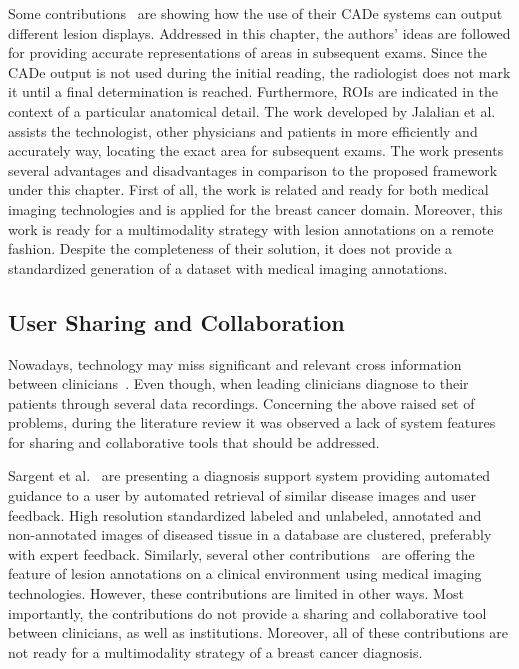 Some contributions~\cite{10.1001/jamainternmed.2015.5231, jiang2018interpretation, 10.1145/3373017.3373051} are showing how the use of their \ac{CADe} systems can output different lesion displays.
Addressed in this chapter, the authors' ideas are followed for providing accurate representations of areas in subsequent exams.
Since the \ac{CADe} output is not used during the initial reading, the radiologist does not mark it until a final determination is reached.
Furthermore, \acp{ROI} are indicated in the context of a particular anatomical detail.
The work developed by Jalalian et al.~\cite{JALALIAN2013420} assists the technologist, other physicians and patients in more efficiently and accurately way, locating the exact area for subsequent exams.
The work presents several advantages and disadvantages in comparison to the proposed framework under this chapter.
First of all, the work is related and ready for both medical imaging technologies and is applied for the breast cancer domain.
Moreover, this work is ready for a multimodality strategy with lesion annotations on a remote fashion.
Despite the completeness of their solution, it does not provide a standardized generation of a dataset with medical imaging annotations.

\subsection{User Sharing and Collaboration}
\label{sec:sec004002003}

Nowadays, technology may miss significant and relevant cross information between clinicians~\cite{10.1145/3313831.3376710}.
Even though, when leading clinicians diagnose to their patients through several data recordings.
Concerning the above raised set of problems, during the literature review it was observed a lack of system features for sharing and collaborative tools that should be addressed.

Sargent et al.~\cite{10.1007/978-3-030-59725-2_21} are presenting a diagnosis support system providing automated guidance to a user by automated retrieval of similar disease images and user feedback.
High resolution standardized labeled and unlabeled, annotated and non-annotated images of diseased tissue in a database are clustered, preferably with expert feedback.
Similarly, several other contributions~\cite{10.3389/fphy.2018.00051, DALILA2017749} are offering the feature of lesion annotations on a clinical environment using medical imaging technologies.
However, these contributions are limited in other ways.
Most importantly, the contributions do not provide a sharing and collaborative tool between clinicians, as well as institutions.
Moreover, all of these contributions are not ready for a multimodality strategy of a breast cancer diagnosis.

